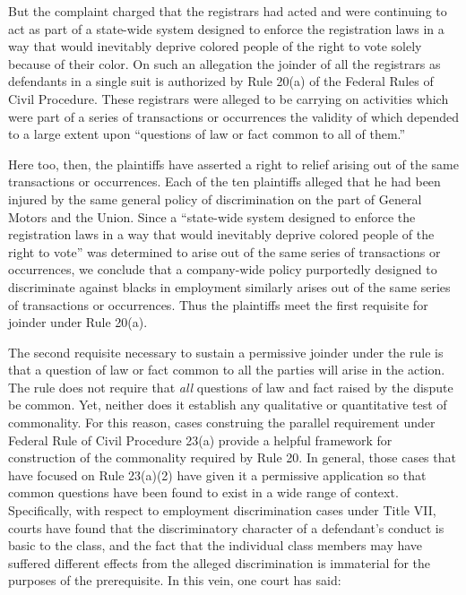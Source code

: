 \documentclass[11pt,letterpaper,twoside]{article}
\renewenvironment{quote}{%
   \list{}{%
     \leftmargin2em   %
     \rightmargin\leftmargin\parsep .1em }
   \item\relax
}
{\endlist}
\begin{document}
\begin{quote}
But the complaint charged that the registrars had acted and were
continuing to act as part of a state-wide system designed to enforce the
registration laws in a way that would inevitably deprive colored people
of the right to vote solely because of their color. On such an
allegation the joinder of all the registrars as defendants in a single
suit is authorized by Rule 20(a) of the Federal Rules of Civil
Procedure. These registrars were alleged to be carrying on activities
which were part of a series of transactions or occurrences the validity
of which depended to a large extent upon ``questions of law or fact
common to all of them.''
\end{quote}

Here too, then, the plaintiffs have asserted a right to relief arising
out of the same transactions or occurrences. Each of the ten plaintiffs
alleged that he had been injured by the same general policy of
discrimination on the part of General Motors and the Union. Since a
``state-wide system designed to enforce the registration laws in a way
that would inevitably deprive colored people of the right to vote'' was
determined to arise out of the same series of transactions or
occurrences, we conclude that a company-wide policy purportedly designed
to discriminate against blacks in employment similarly arises out of the
same series of transactions or occurrences. Thus the plaintiffs meet the
first requisite for joinder under Rule 20(a).

The second requisite necessary to sustain a permissive joinder under the
rule is that a question of law or fact common to all the parties will
arise in the action. The rule does not require that \emph{all} questions
of law and fact raised by the dispute be common. Yet, neither does it
establish any qualitative or quantitative test of commonality. For this
reason, cases construing the parallel requirement under Federal Rule of
Civil Procedure 23(a) provide a helpful framework for construction of
the commonality required by Rule 20. In general, those cases that have
focused on Rule 23(a)(2) have given it a permissive application so that
common questions have been found to exist in a wide range of context.
Specifically, with respect to employment discrimination cases under
Title VII, courts have found that the discriminatory character of a
defendant's conduct is basic to the class, and the fact that the
individual class members may have suffered different effects from the
alleged discrimination is immaterial for the purposes of the
prerequisite. In this vein, one court has said:
\end{document}
